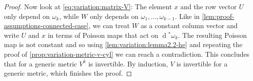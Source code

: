 \documentclass[10pt,a4paper]{amsart}
\renewcommand{\d}{\operatorname{d}\!}
\begin{document}
\begin{proof}
	Now look at \cref{eq:variation:matrix-V}: The element $x$ and the row vector $U$ only depend on $\omega_k$, while $W$ only depends on $\omega_1, \ldots, \omega_{k-1}$. Like in \cref{lem:proof-assumptions-connected-case}, we can treat $W$ as a constant column vector and write $U$ and $x$ in terms of Poisson maps that act on $\d^* \omega_k$. The resulting Poisson map is not constant and so using \cref{lem:variation:lemma2.2-he} and repeating the proof of \cref{prop:variation-metric-v-cyl} we can reach a contradiction. This concludes that for a generic metric $V^k$ is invertible. 
	By induction, $V$ is invertible for a generic metric, which finishes the proof.
\end{proof}
\end{document}
